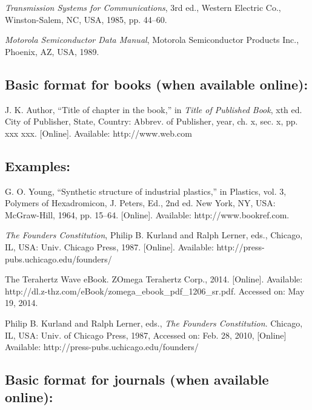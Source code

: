 \documentclass[journal]{IEEEtran}
\begin{document}
\begin{thebibliography}{34}
\setcounter{enumiv}{7}

\bibitem{} {\em Transmission Systems for Communications}, 3rd ed., Western Electric Co., Winston-Salem, NC, USA, 1985, pp. 44--60.

\bibitem{} {\em Motorola Semiconductor Data Manual}, Motorola Semiconductor Products Inc., Phoenix, AZ, USA, 1989.
\end{thebibliography}

\subsection*{Basic format for books (when available online):}

J. K. Author, ``Title of chapter in the book,'' in {\em Title of Published Book}, xth ed. City of Publisher, State, Country: Abbrev. of Publisher, year, ch. x, sec. x, pp. xxx xxx. [Online]. Available: http://www.web.com 

\subsection*{Examples:}

\begin{thebibliography}{34}
\setcounter{enumiv}{9}

\bibitem{}G. O. Young, ``Synthetic structure of industrial plastics,'' in Plastics, vol. 3, Polymers of Hexadromicon, J. Peters, Ed., 2nd ed. New York, NY, USA: McGraw-Hill, 1964, pp. 15--64. [Online]. Available: http://www.bookref.com. 

\bibitem{} {\em The Founders Constitution}, Philip B. Kurland and Ralph Lerner, eds., Chicago, IL, USA: Univ. Chicago Press, 1987. [Online]. Available: http://press-pubs.uchicago.edu/founders/

\bibitem{} The Terahertz Wave eBook. ZOmega Terahertz Corp., 2014. [Online]. Available: http://dl.z-thz.com/eBook/zomega\_ebook\_pdf\_1206\_sr.pdf. Accessed on: May 19, 2014. 

\bibitem{} Philip B. Kurland and Ralph Lerner, eds., {\em The Founders Constitution}. Chicago, IL, USA: Univ. of Chicago Press, 1987, Accessed on: Feb. 28, 2010, [Online] Available: http://press-pubs.uchicago.edu/founders/ 
\end{thebibliography}

\subsection*{Basic format for journals (when available online):}
\end{document}
